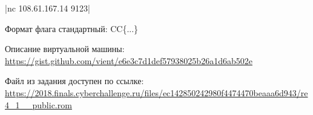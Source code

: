 
|nc 108.61.167.14 9123|

Формат флага стандартный: CC\{...\}

Описание виртуальной машины: \url{https://gist.github.com/vient/e6e3c7d1def57938025b26a1d6ab502e}

Файл из задания доступен по ссылке: \url{https://2018.finals.cyberchallenge.ru/files/ec142850242980f4474470beaaa6d943/re4_1__public.rom}
 
